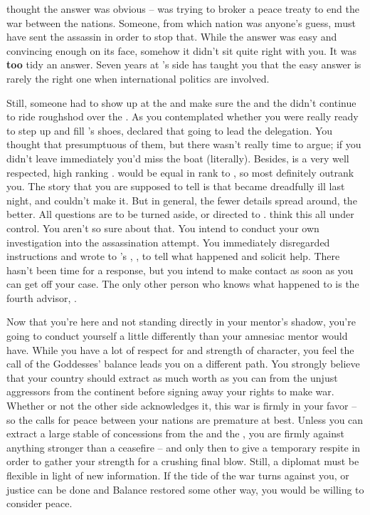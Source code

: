 \documentclass[char]{GL2020}
\begin{document}
\cEbbPriest{} thought the answer was obvious -- \cHeadDiplomat{} was trying to broker a peace treaty to end the war between the nations. Someone, from which nation was anyone's guess, must have sent the assassin in order to stop that. While the answer was easy and convincing enough on its face, somehow it didn't sit quite right with you. It was \textbf{too} tidy an answer. Seven years at \cHeadDiplomat{}'s side has taught you that the easy answer is rarely the right one when international politics are involved.

Still, someone had to show up at the \pSchool{} and make sure the \pTech{} and the \pFarm{} didn't continue to ride roughshod over the \pShip{}. As you contemplated whether you were really ready to step up and fill \cHeadDiplomat{}'s shoes, \cEbbPriest{} declared that \cEbbPriest{\they} \cEbbPriest{\were} going to lead the delegation. You thought that presumptuous of them, but there wasn't really time to argue; if you didn't leave immediately you'd miss the boat (literally). Besides, \cEbbPriest{} is a very well respected, high ranking \cEbbPriest{\cleric}. \cEbbPriest{\They} would be equal in rank to \cHeadDiplomat{}, so \cEbbPriest{\they} most definitely outrank\cEbbPriest{\plural} you. The story that you are supposed to tell is that \cHeadDiplomat{} became dreadfully ill last night, and couldn't make it. But in general, the fewer details spread around, the better. All questions are to be turned aside, or directed to \cEbbPriest{}. \cEbbPriest{\They} think\cEbbPriest{\plural} \cEbbPriest{\they} \cEbbPriest{\have} this all under control. You aren't so sure about that. You intend to conduct your own investigation into the assassination attempt. You immediately disregarded instructions and wrote to \cHeadDiplomat{}'s \cPresident{\nibling}, \cPresident{\full}, to tell \cPresident{\them} what happened and solicit \cPresident{\their} help. There hasn't been time for a response, but you intend to make contact as soon as you can get \cEbbPriest{} off your case. The only other person who knows what happened to \cHeadDiplomat{} is the fourth \pShippie{} advisor, \cBunker{\full}. 

Now that you're here and not standing directly in your mentor's shadow, you're going to conduct yourself a little differently than your amnesiac mentor would have. While you have a lot of respect for \cHeadDiplomat{} and \cHeadDiplomat{\their} strength of character, you feel the call of the Goddesses' balance leads you on a different path. You strongly believe that your country should extract as much worth as you can from the unjust aggressors from the continent before signing away your rights to make war. Whether or not the other side acknowledges it, this war is firmly in your favor – so the calls for peace between your nations are premature at best. Unless you can extract a large stable of concessions from the \pTech{} and the \pFarm{}, you are firmly against anything stronger than a ceasefire – and only then to give a temporary respite in order to gather your strength for a crushing final blow. Still, a diplomat must be flexible in light of new information. If the tide of the war turns against you, or justice can be done and Balance restored some other way, you would be willing to consider peace. 
\end{document}
